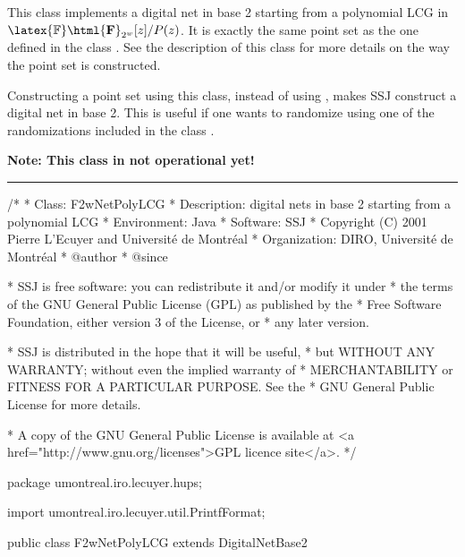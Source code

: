 

This class implements a digital net in base 2 starting from a
polynomial LCG in $\latex{\mathbb{F}}\html{\mathbf{F}}_{2^w}[z]/P(z)$.
 It is exactly the same
point set as the one defined in the class 
 .
 See the description
of this class for more details on the way the point set is constructed.

Constructing a point set using this class, instead of using
 ,
makes SSJ construct a digital net in base 2.  This is useful if one
wants to randomize using one of the randomizations included in the class
 .

\textbf{Note: This class in not operational yet!}

\bigskip\hrule\bigskip

\begin{code}
\begin{hide}
/*
 * Class:        F2wNetPolyLCG
 * Description:  digital nets in base 2 starting from a polynomial LCG 
 * Environment:  Java
 * Software:     SSJ 
 * Copyright (C) 2001  Pierre L'Ecuyer and Université de Montréal
 * Organization: DIRO, Université de Montréal
 * @author       
 * @since

 * SSJ is free software: you can redistribute it and/or modify it under
 * the terms of the GNU General Public License (GPL) as published by the
 * Free Software Foundation, either version 3 of the License, or
 * any later version.

 * SSJ is distributed in the hope that it will be useful,
 * but WITHOUT ANY WARRANTY; without even the implied warranty of
 * MERCHANTABILITY or FITNESS FOR A PARTICULAR PURPOSE.  See the
 * GNU General Public License for more details.

 * A copy of the GNU General Public License is available at
   <a href="http://www.gnu.org/licenses">GPL licence site</a>.
 */
\end{hide}
package umontreal.iro.lecuyer.hups; \begin{hide} 

import umontreal.iro.lecuyer.util.PrintfFormat;
\end{hide}

public class F2wNetPolyLCG extends DigitalNetBase2 \begin{hide} 
{
   private F2wStructure param;

    /**
     * Constructs and stores the set of cycles for an LCG with
     *    modulus <SPAN CLASS="MATH"><I>n</I></SPAN> and multiplier <SPAN CLASS="MATH"><I>a</I></SPAN>.
     *   If pgcd<SPAN CLASS="MATH">(<I>a</I>, <I>n</I>) = 1</SPAN>, this constructs a full-period LCG which has two
     *   cycles, one containing 0 and one, the LCG period.
     *
     * @param n required number of points and modulo of the LCG
     *
     *    @param a generator <SPAN CLASS="MATH"><I>a</I></SPAN> of the LCG
     *
     *
     */
\end{hide}
\end{code}

